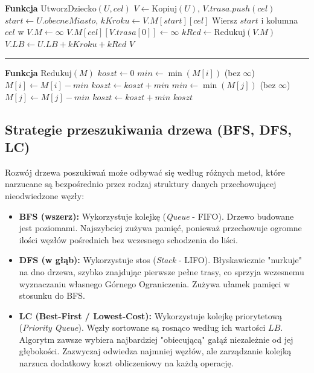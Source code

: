 \documentclass[conference]{IEEEtran}
\begin{document}
\begin{algorithm}
\begin{algorithmic}[1]
                    \STATE \textbf{Funkcja} $\text{UtworzDziecko}(U, cel)$
                    \STATE $V \leftarrow \text{Kopiuj}(U)$, $V.trasa.push(cel)$
                    \STATE $start \leftarrow U.obecneMiasto$, $kKroku \leftarrow V.M[start][cel]$                   
                    \STATE Wiersz $start$ i kolumna $cel$ w $V.M \leftarrow \infty$
                    \STATE $V.M[cel][V.trasa[0]] \leftarrow \infty$
                    \STATE $kRed \leftarrow \text{Redukuj}(V.M)$
                    \STATE $V.LB \leftarrow U.LB + kKroku + kRed$
                    \RETURN $V$                    
                    \vspace{0.15cm}\hrule\vspace{0.15cm}
                    \STATE \textbf{Funkcja} $\text{Redukuj}(M)$
                    \STATE $koszt \leftarrow 0$
                        \STATE $min \leftarrow \min(M[i])$ (bez $\infty$)
                            \STATE $M[i] \leftarrow M[i] - min$
                            \STATE $koszt \leftarrow koszt + min$
                        \ENDIF
                    \ENDFOR
                        \STATE $min \leftarrow \min(M[j])$ (bez $\infty$)
                            \STATE $M[j] \leftarrow M[j] - min$
                            \STATE $koszt \leftarrow koszt + min$
                        \ENDIF
                    \ENDFOR
                    \RETURN $koszt$
                    \end{algorithmic}
                \end{algorithm}
        \subsection{Strategie przeszukiwania drzewa (BFS, DFS, LC)}
            Rozwój drzewa poszukiwań może odbywać się według różnych metod, które narzucane są bezpośrednio przez rodzaj struktury danych przechowującej nieodwiedzone węzły:
            \begin{itemize}
                \item \textbf{BFS (wszerz):} Wykorzystuje kolejkę (\textit{Queue} - FIFO). Drzewo budowane jest poziomami. Najszybciej zużywa pamięć, ponieważ przechowuje ogromne ilości węzłów pośrednich bez wczesnego schodzenia do liści.
                \item \textbf{DFS (w głąb):} Wykorzystuje stos (\textit{Stack} - LIFO). Błyskawicznie "nurkuje" na dno drzewa, szybko znajdując pierwsze pełne trasy, co sprzyja wczesnemu wyznaczaniu własnego Górnego Ograniczenia. Zużywa ułamek pamięci w stosunku do BFS.
                \item \textbf{LC (Best-First / Lowest-Cost):} Wykorzystuje kolejkę priorytetową (\textit{Priority Queue}). Węzły sortowane są rosnąco według ich wartości $LB$. Algorytm zawsze wybiera najbardziej "obiecującą" gałąź niezależnie od jej głębokości. Zazwyczaj odwiedza najmniej węzłów, ale zarządzanie kolejką narzuca dodatkowy koszt obliczeniowy na każdą operację.
            \end{itemize}
\end{document}
